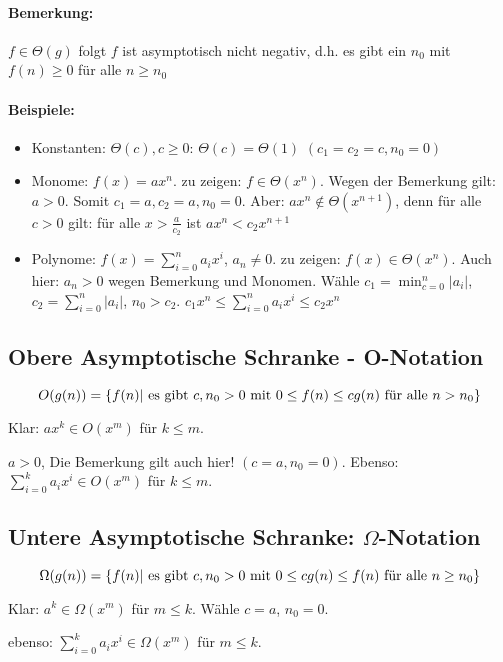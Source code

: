 \documentclass[a4paper,twoside,DIV15,BCOR12mm]{scrbook}
\begin{document}
\paragraph{Bemerkung:} $f\in\Theta(g)$ folgt $f$ ist asymptotisch nicht negativ, d.h. es gibt ein $n_0$ mit $f(n)\ge0$ für alle $n\ge n_0$

\paragraph{Beispiele:}
\begin{itemize}
\item Konstanten: $\Theta(c), c\ge 0$: $\Theta(c) = \Theta(1)$ $(c_1=c_2=c,n_0=0)$
\item Monome:  $f(x) = ax^n$. zu zeigen: $f\in\Theta(x^n)$. Wegen der Bemerkung gilt: $a>0$. Somit $c_1 = a, c_2=a, n_0=0$. Aber: $ax^n \notin \Theta(x^{n+1})$, denn für alle $c>0$ gilt: für alle $x>\frac{a}{c_2}$ ist $ax^n < c_2x^{n+1}$
\item Polynome: $f(x) = \sum_{i=0}^na_ix^i$, $a_n\ne0$. zu zeigen: $f(x) \in \Theta(x^n)$. Auch hier: $a_n>0$ wegen Bemerkung und Monomen. Wähle $c_1=\min_{c=0}^n|a_i|$, $c_2=\sum_{i=0}^n|a_i|$, $n_0>c_2$. $c_1x^n\le \sum_{i=0}^{n}a_ix^i\le c_2x^n$
\end{itemize}

\subsection{Obere Asymptotische Schranke - O-Notation}

$$ O(g(n))=\{f(n)| \textnormal{ es gibt } c,n_0>0 \textnormal{ mit } 0 \leq f(n) \leq cg(n) \textnormal{ für alle } n>n_0 \} $$

Klar: $ax^k\in O(x^m) $ für $k\le m$.

$a>0$, Die Bemerkung gilt auch hier! $(c=a,n_0=0)$. Ebenso: $\sum_{i=0}^ka_ix^i\in O(x^m)$ für $k\le m$.

\subsection{Untere Asymptotische Schranke: $\Omega$-Notation}

$$ \Omega(g(n))=\{f(n)| \textnormal{ es gibt } c,n_0>0 \textnormal{ mit } 0 \leq cg(n)\leq f(n) \textnormal{ für alle } n \geq n_0 \} $$

Klar: $a^k\in\Omega(x^m)$ für $m\le k$. Wähle $c=a$, $n_0=0$.

ebenso: $\sum_{i=0}^ka_ix^i\in\Omega(x^m)$ für $m\le k$.
\end{document}
